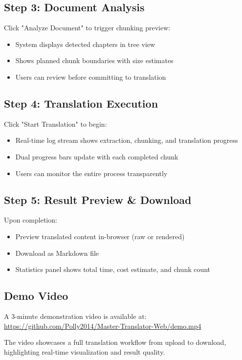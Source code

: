 \documentclass[11pt]{article}
\begin{document}
\subsection{Step 3: Document Analysis}
Click "Analyze Document" to trigger chunking preview:
\begin{itemize}
    \item System displays detected chapters in tree view
    \item Shows planned chunk boundaries with size estimates
    \item Users can review before committing to translation
\end{itemize}

\subsection{Step 4: Translation Execution}
Click "Start Translation" to begin:
\begin{itemize}
    \item Real-time log stream shows extraction, chunking, and translation progress
    \item Dual progress bars update with each completed chunk
    \item Users can monitor the entire process transparently
\end{itemize}

\subsection{Step 5: Result Preview \& Download}
Upon completion:
\begin{itemize}
    \item Preview translated content in-browser (raw or rendered)
    \item Download as Markdown file
    \item Statistics panel shows total time, cost estimate, and chunk count
\end{itemize}

\subsection{Demo Video}

A 3-minute demonstration video is available at: \\
\url{https://github.com/Polly2014/Master-Translator-Web/demo.mp4}

The video showcases a full translation workflow from upload to download, highlighting real-time visualization and result quality.
\end{document}
